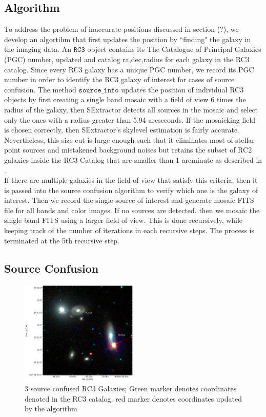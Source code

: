 \documentclass[5p]{elsarticle}
\begin{document}
	\subsection{Algorithm}
	To address the problem of inaccurate positions discussed in section (?), we develop an algortihm that first updates the position by ``finding" the galaxy in the imaging data. 
	An  $\texttt{RC3}$ object contains its The Catalogue of Principal Galaxies (PGC) number, updated and catalog ra,dec,radius for each galaxy in the RC3 catalog. Since every RC3 galaxy has a unique PGC number, we record  its PGC number in order to identify the RC3 galaxy of interest for cases of source confusion. The method $\texttt{source\_info}$ updates the position of individual RC3 objects by first creating a single band mosaic with a field of view 6 times the radius of the galaxy, then SExtractor detects all sources in the mosaic and select only the ones with a radius greater than 5.94 arcseconds.  If the mosaicking field is chosen correctly, then SExtractor's skylevel estimation is fairly accurate.  Nevertheless, this size cut is large enough such that it eliminates most of stellar point sources and mistakened background noises  but retains the subset of RC2 galaxies inside the RC3 Catalog that are smaller than 1 arcminute as described in \citet{rc2}. 
\\
\indent If there are multiple galaxies in the field of view that satisfy this criteria, then it is passed into the source confusion algorithm to verify which one is the galaxy of interest. Then we record the single source of interest and generate mosaic FITS file for all bands and color images. If no sources are detected, then we mosaic  the single band FITS using a larger field of view. This is done recursively, while keeping track of the number of iterations in each recursive steps. The process is terminated at the 5th recursive step. %
	\subsection{Source Confusion}
		\begin{figure}[h]
		\includegraphics[width=0.5\textwidth]{figures/navigator}
		\caption{3 source confused RC3 Galaxies; Green marker denotes coordinates denoted in the RC3 catalog, red marker denotes coordinates updated by the algorithm}
	\end{figure}
\end{document}
